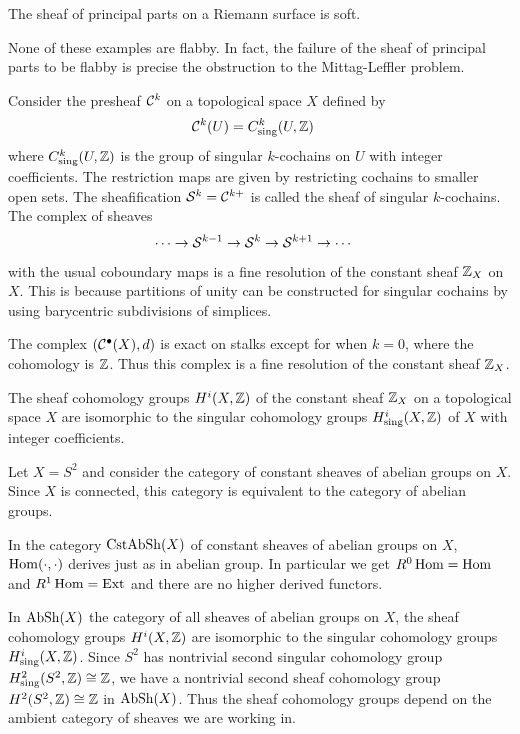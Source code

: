 \documentclass[12pt]{article}
\begin{document}
\begin{example}
    The sheaf of principal parts on a Riemann surface is soft. 
\end{example}
None of these examples are flabby. In fact, the failure of the sheaf of principal parts to be flabby is precise the obstruction to the Mittag-Leffler problem.

\begin{example}
    Consider the presheaf ${\mathcal{C}}^k$ on a topological space $X$ defined by \begin{align*}
        {\mathcal{C}}^k(U) & = C^k_{\text{sing}}(U, \mathbb{Z})
    \end{align*} where $C^k_{\text{sing}}(U, \mathbb{Z})$ is the group of singular $k$-cochains on $U$ with integer coefficients. The restriction maps are given by restricting cochains to smaller open sets. The sheafification ${\mathcal{S}}^k = {\mathcal{C}}^{k+}$ is called the sheaf of singular $k$-cochains. The complex of sheaves \begin{align*}
        \cdots \to {\mathcal{S}}^{k-1} & \to {\mathcal{S}}^k \to {\mathcal{S}}^{k+1} \to \cdots
    \end{align*} with the usual coboundary maps is a fine resolution of the constant sheaf $\mathbb{Z}_X$ on $X$. This is because partitions of unity can be constructed for singular cochains by using barycentric subdivisions of simplices.
    
    The complex $({\mathcal{C}}^\bullet(X), d)$ is exact on stalks except for when $k=0$, where the cohomology is $\mathbb{Z}$. Thus this complex is a fine resolution of the constant sheaf $\mathbb{Z}_X$.
\end{example}

\begin{corollary}
    The sheaf cohomology groups $H^i(X, \mathbb{Z})$ of the constant sheaf $\mathbb{Z}_X$ on a topological space $X$ are isomorphic to the singular cohomology groups $H^i_{\text{sing}}(X, \mathbb{Z})$ of $X$ with integer coefficients.
\end{corollary}

\begin{example}
     Let $X = S^2$ and consider the category of constant sheaves of abelian groups on $X$. Since $X$ is connected, this category is equivalent to the category of abelian groups. 

    In the category $\operatorname{CstAbSh}(X)$ of constant sheaves of abelian groups on $X$, $\operatorname{Hom}(\cdot,\cdot)$ derives just as in abelian group. In particular we get $R^0\operatorname{Hom} = \operatorname{Hom}$ and $R^1 \operatorname{Hom} = \operatorname{Ext}$ and there are no higher derived functors. 

    In $\operatorname{AbSh}(X)$ the category of all sheaves of abelian groups on $X$, the sheaf cohomology groups $H^i(X, \mathbb{Z})$ are isomorphic to the singular cohomology groups $H^i_{\text{sing}}(X, \mathbb{Z})$. Since $S^2$ has nontrivial second singular cohomology group $H^2_{\text{sing}}(S^2, \mathbb{Z}) \cong \mathbb{Z}$, we have a nontrivial second sheaf cohomology group $H^2(S^2, \mathbb{Z}) \cong \mathbb{Z}$ in $\operatorname{AbSh}(X)$. Thus the sheaf cohomology groups depend on the ambient category of sheaves we are working in.
\end{example}
\end{document}
